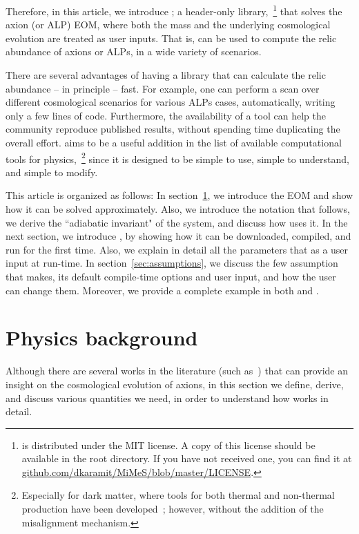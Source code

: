 \documentclass[11pt,a4paper]{article}
\begin{document}
Therefore, in this article, we introduce \mimes;  a header-only \CPP library,~\footnote{\mimes is distributed under the MIT license. A copy of this license should be available in the \mimes root directory. If you have not received one, you can find it at  \href{https://github.com/dkaramit/MiMeS/blob/master/LICENSE}{github.com/dkaramit/MiMeS/blob/master/LICENSE}.} that solves the axion (or ALP) EOM, where both the mass and the underlying cosmological evolution are treated as user inputs. That is, \mimes can be used to compute the relic abundance of axions or ALPs, in a wide variety of scenarios.

There are several advantages of having a library that can calculate the relic abundance -- in principle -- fast. For example, one can perform a scan over different cosmological scenarios for various ALPs cases, automatically, writing only a few lines of code. Furthermore, the availability of a tool can help the community reproduce published results, without spending time duplicating the overall effort. \mimes aims to be a useful addition in the list of available computational tools for physics,~\footnote{Especially for dark matter, where tools for both thermal and non-thermal production have been developed~\cite{Gondolo:2004sc,Belanger:2013oya,Belanger:2018ccd,Binder:2021bmg}; however, without the addition of the misalignment mechanism.} since it is designed to be simple to use, simple to understand, and simple to modify.

This article is organized as follows: 
%
In section~\ref{sec:Physics}, we introduce the EOM and show how it can be solved approximately. Also, we introduce the notation that \mimes follows, we derive the ``adiabatic invariant" of the system, and discuss how \mimes uses it. 
%
In the next section, we introduce \mimes,
 by showing how it can be downloaded, compiled, and run for the first time. Also, we explain in detail all the parameters that \mimes as a user input at run-time.
%
In section~\ref{sec:assumptions}, we discuss the few assumption that \mimes makes, its default compile-time options and user input, and how the user can change them. Moreover, we provide a complete example in both \CPP and \PY. 

\section{Physics background}\label{sec:Physics}
\setcounter{equation}{0}
%
Although there are several works in the literature (such as~\cite{Chang:1998ys,MARSH20161}) that can provide an insight on the cosmological evolution of axions, in this section we define, derive, and discuss various quantities we need, in order to understand how \mimes works in detail.
\end{document}
